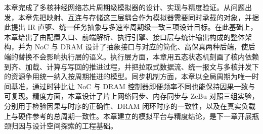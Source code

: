 
本章完成了多核神经网络芯片周期级模拟器的设计、实现与精度验证。从问题出发，本章先把映射、互连与存储这三层耦合作为模拟器需要同时承载的对象，并据此提出 IR 直驱、统一任务抽象与多速率周期级一致三项设计目标。在此基础上，本章给出了由配置入口、前端解析、执行引擎、接口层与统计输出构成的整体架构，并为 NoC 与 DRAM 设计了抽象接口与对应的简化、高保真两种后端，使后端的替换不会影响执行层的语义。执行层方面，本章用五态状态机刻画了核内依赖到齐、加载、计算与写回的推进过程，并把拉取式数据流、统一报文与多核并发下的资源争用统一纳入按周期推进的模型。同步机制方面，本章以全局周期为唯一时间基准，通过时钟比让 NoC 与 DRAM 控制器即便频率不同也能保持因果一致与可复现。精度方面，本章设计了片上网络同步、内存同步与 ZeBu 对照三组实验，分别用于检验因果与时序的正确性、DRAM 闭环时序的一致性，以及在真实负载上与硬件参考的总周期一致性。本章建立的模拟平台与精度结论，是下一章开展瓶颈归因与设计空间探索的工程基础。
